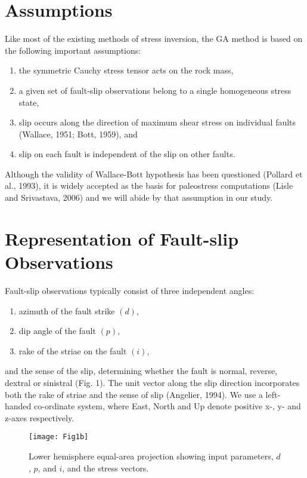 \onehalfspacing
\section{Assumptions}
Like most of the existing methods of stress inversion, the GA method is based on the following important assumptions:
\renewcommand{\theenumi}{\roman{enumi}}
\begin{enumerate}
    \item the symmetric Cauchy stress tensor acts on the rock mass,
    \item a given set of fault-slip observations belong to a single homogeneous stress state,
    \item slip occurs along the direction of maximum shear stress on individual faults (Wallace, 1951; Bott, 1959), and 
    \item slip on each fault is independent of the slip on other faults.
\end{enumerate}
Although the validity of Wallace-Bott hypothesis has been questioned (Pollard et al., 1993), it is widely accepted as the basis for paleostress computations (Lisle and Srivastava, 2006) and we will abide by that assumption in our study.

\pagebreak
\section{Representation of Fault-slip Observations} \label{sec:2.1}
Fault-slip observations typically consist of three independent angles:
\renewcommand{\theenumi}{\roman{enumi}}
\begin{enumerate}
    \item azimuth of the fault strike $(d)$,
    \item dip angle of the fault $(p)$,
    \item rake of the striae on the fault $(i)$, 
\end{enumerate}
and the sense of the slip, determining whether the fault is normal, reverse, dextral or sinistral (Fig. 1). The unit vector along the slip direction incorporates both the rake of striae and the sense of slip (Angelier, 1994). We use a left-handed co-ordinate system, where East, North and Up denote positive x-, y- and z-axes respectively.

\begin{figure}[h]
\centering
\texttt{[image: Fig1b]}
\caption{Lower hemisphere equal-area projection showing input parameters, $d$, $p$, and $i$, and the stress vectors.}
\label{fig1}
\end{figure}

